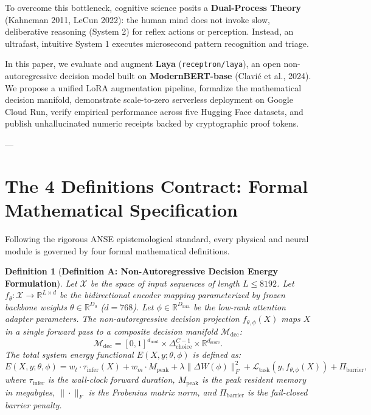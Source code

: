 \documentclass[10pt,journal,compsoc]{IEEEtran}
\newtheorem{definition}{Definition}
\theoremstyle{remark}
\begin{document}
To overcome this bottleneck, cognitive science posits a \textbf{Dual-Process Theory} (Kahneman 2011, LeCun 2022): the human mind does not invoke slow, deliberative reasoning (System 2) for reflex actions or perception. Instead, an ultrafast, intuitive System 1 executes microsecond pattern recognition and triage.

In this paper, we evaluate and augment \textbf{Laya} (\texttt{receptron/laya}), an open non-autoregressive decision model built on \textbf{ModernBERT-base} (Clavi\'e et al., 2024). We propose a unified LoRA augmentation pipeline, formalize the mathematical decision manifold, demonstrate scale-to-zero serverless deployment on Google Cloud Run, verify empirical performance across five Hugging Face datasets, and publish unhallucinated numeric receipts backed by cryptographic proof tokens.

---

\section{The 4 Definitions Contract: Formal Mathematical Specification}
Following the rigorous ANSE epistemological standard, every physical and neural module is governed by four formal mathematical definitions.

\begin{definition}[\textbf{Definition A: Non-Autoregressive Decision Energy Formulation}]
Let $\mathcal{X}$ be the space of input sequences of length $L \le 8192$. Let $f_\theta: \mathcal{X} \to \mathbb{R}^{L \times d}$ be the bidirectional encoder mapping parameterized by frozen backbone weights $\theta \in \mathbb{R}^{D_0}$ ($d=768$). Let $\phi \in \mathbb{R}^{D_{\text{lora}}}$ be the low-rank attention adapter parameters. The non-autoregressive decision projection $f_{\theta, \phi}(X)$ maps $X$ in a single forward pass to a composite decision manifold $\mathcal{M}_{\text{dec}}$:
\begin{equation}
\mathcal{M}_{\text{dec}} = [0, 1]^{d_{\text{noul}}} \times \Delta^{C-1}_{\text{choice}} \times \mathbb{R}^{d_{\text{score}}}.
\end{equation}
The total system energy functional $E(X, y; \theta, \phi)$ is defined as:
\begin{equation}
E(X, y; \theta, \phi) = w_t \cdot \tau_{\text{infer}}(X) + w_m \cdot M_{\text{peak}} + \lambda \|\Delta W(\phi)\|_F^2 + \mathcal{L}_{\text{task}}(y, f_{\theta, \phi}(X)) + \Pi_{\text{barrier}},
\label{eq:manifold_energy}
\end{equation}
where $\tau_{\text{infer}}$ is the wall-clock forward duration, $M_{\text{peak}}$ is the peak resident memory in megabytes, $\|\cdot\|_F$ is the Frobenius matrix norm, and $\Pi_{\text{barrier}}$ is the fail-closed barrier penalty.
\end{definition}
\end{document}
